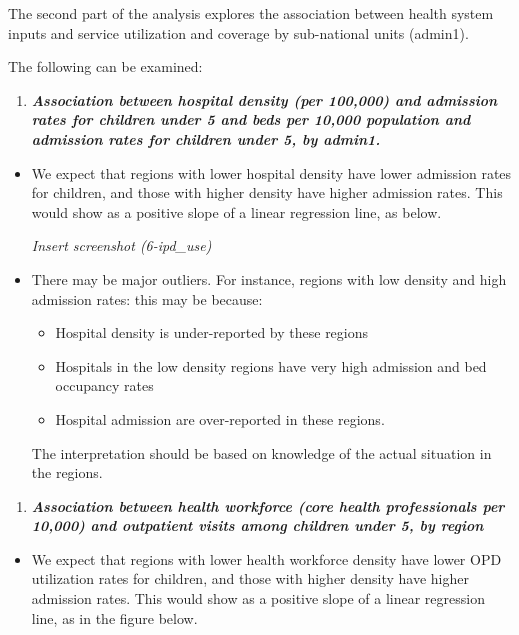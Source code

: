 \documentclass[
  english,
  letterpaper,
  DIV=11,
  numbers=noendperiod]{scrreprt}
\providecommand{\tightlist}{%
  \setlength{\itemsep}{0pt}\setlength{\parskip}{0pt}}
\begin{document}
The second part of the analysis explores the association between health
system inputs and service utilization and coverage by sub-national units
(admin1).~

The following can be examined:

\begin{enumerate}
\def\labelenumi{\arabic{enumi}.}
\tightlist
\item
  \textbf{\emph{Association between hospital density (per 100,000) and
  admission rates for children under 5 and beds per 10,000 population
  and admission rates for children under 5, by admin1.}}~
\end{enumerate}

\begin{itemize}
\item
  We expect that regions with lower hospital density have lower
  admission rates for children, and those with higher density have
  higher admission rates. This would show as a positive slope of a
  linear regression line, as below.~

  \emph{Insert screenshot (6-ipd\_use)}
\item
  There may be major outliers. For instance, regions with low density
  and high admission rates: this may be because:

  \begin{itemize}
  \item
    Hospital density is under-reported by these regions
  \item
    Hospitals in the low density regions have very high admission and
    bed occupancy rates
  \item
    Hospital admission are over-reported in these regions.
  \end{itemize}

  The interpretation should be based on knowledge of the actual
  situation in the regions.
\end{itemize}

\begin{enumerate}
\def\labelenumi{\arabic{enumi}.}
\setcounter{enumi}{1}
\tightlist
\item
  \textbf{\emph{Association between health workforce (core health
  professionals per 10,000) and outpatient visits among children under
  5, by region}}
\end{enumerate}

\begin{itemize}
\tightlist
\item
  We expect that regions with lower health workforce density have lower
  OPD utilization rates for children, and those with higher density have
  higher admission rates. This would show as a positive slope of a
  linear regression line, as in the figure below.
\end{itemize}
\end{document}

